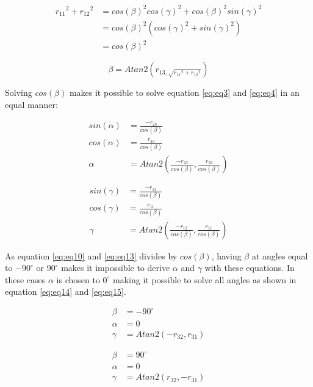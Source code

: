 \begin{align}
r{_{11}}^{2} + r{_{12}}^{2} &= cos(\beta )^2cos(\gamma )^2+cos(\beta )^2sin(\gamma )^2 \nonumber \\
 &=cos(\beta )^2(cos(\gamma )^2+sin(\gamma )^2) \nonumber \\
 &=cos(\beta )^2 \label{eq:eq6}
\end{align}

\begin{equation}
\beta = Atan2(r_{13,\sqrt{r{_{11}}^{2} + r{_{12}}^{2}}})
\label{eq:eq7}
\end{equation}


Solving $cos(\beta)$ makes it possible to solve equation \eqref{eq:eq3} and \eqref{eq:eq4} in an equal manner:

\begin{align}
sin(\alpha ) &= \tfrac{-r_{23}}{cos(\beta )} \nonumber \\
cos(\alpha ) &= \tfrac{r_{33}}{cos(\beta )}  \nonumber \\
\alpha &= Atan2(\tfrac{-r_{23}}{cos(\beta )},\tfrac{r_{33}}{cos(\beta )}) \label{eq:eq10}
\end{align}

\begin{align}
sin(\gamma ) &=\tfrac{-r_{12}}{cos(\beta )} \nonumber \\
cos(\gamma ) &= \tfrac{r_{11}}{cos(\beta )} \nonumber \\
\gamma &= Atan2(\tfrac{-r_{12}}{cos(\beta )},\tfrac{r_{11}}{cos(\beta )}) \label{eq:eq13}
\end{align}

As equation \eqref{eq:eq10} and \eqref{eq:eq13} divides by $cos(\beta)$, having $\beta$ at angles equal to $-90^{\circ}$ or $90^{\circ}$ makes it impossible to derive $\alpha$ and $\gamma$ with these equations. In these cases $\alpha$ is chosen to $0^{\circ}$ making it possible to solve all angles as shown in equation \eqref{eq:eq14} and \eqref{eq:eq15}.

\begin{align}
\beta &= -90^{\circ} \nonumber \\
\alpha &= 0          \nonumber \\
\gamma &= Atan2(-r_{32},r_{31}) \label{eq:eq14}
\end{align}

\begin{align}
\beta &= 90^{\circ} \nonumber \\
\alpha &= 0         \nonumber \\
\gamma &= Atan2(r_{32},-r_{31}) \label{eq:eq15}
\end{align}


